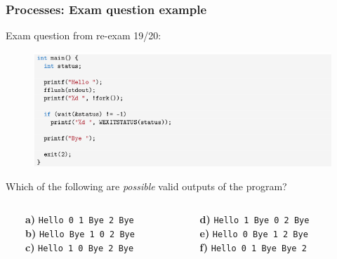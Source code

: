 \documentclass{beamer}
\begin{document}
%
%
%
\begin{frame}
\frametitle{Processes: Exam question example}
Exam question from re-exam 19/20:

\vspace{-3mm}
\begin{figure}
\includegraphics[width=1.0\textwidth]{images/exam_question_1_fork.png}
\end{figure}
\vspace{-3mm}
Which of the following are \textit{possible} valid outputs of the program?
\vspace{2mm}

\begin{columns}
\begin{column}{0.5\textwidth}
\footnotesize
\ \ \ \ \textbf{a)} \texttt{Hello 0 1 Bye 2 Bye}\\
\ \ \ \ \textbf{b)} \texttt{Hello Bye 1 0 2 Bye}\\
\ \ \ \ \textbf{c)} \texttt{Hello 1 0 Bye 2 Bye}
\end{column}
\begin{column}{0.5\textwidth}  %
\footnotesize
\textbf{d)} \texttt{Hello 1 Bye 0 2 Bye}\\
\textbf{e)} \texttt{Hello 0 Bye 1 2 Bye}\\
\textbf{f)} \texttt{Hello 0 1 Bye Bye 2}
\end{column}
\end{columns}

\end{frame}
\end{document}
